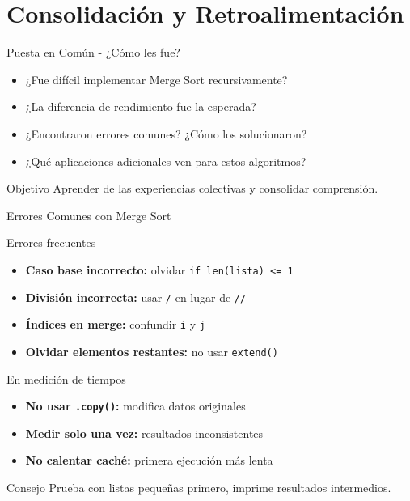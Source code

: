 \documentclass[10pt]{beamer}
\begin{document}
\section{Consolidación y Retroalimentación}

\begin{frame}{Puesta en Común - ¿Cómo les fue?}
  \begin{itemize}
    \item ¿Fue difícil implementar Merge Sort recursivamente?
    \item ¿La diferencia de rendimiento fue la esperada?
    \item ¿Encontraron errores comunes? ¿Cómo los solucionaron?
    \item ¿Qué aplicaciones adicionales ven para estos algoritmos?
  \end{itemize}
  
  \begin{alertblock}{Objetivo}
    Aprender de las experiencias colectivas y consolidar comprensión.
  \end{alertblock}
\end{frame}

\begin{frame}{Errores Comunes con Merge Sort}
  \begin{block}{Errores frecuentes}
    \begin{itemize}
      \item \textbf{Caso base incorrecto:} olvidar \texttt{if len(lista) <= 1}
      \item \textbf{División incorrecta:} usar \texttt{/} en lugar de \texttt{//}
      \item \textbf{Índices en merge:} confundir \texttt{i} y \texttt{j}
      \item \textbf{Olvidar elementos restantes:} no usar \texttt{extend()}
    \end{itemize}
  \end{block}
  
  \begin{block}{En medición de tiempos}
    \begin{itemize}
      \item \textbf{No usar \texttt{.copy()}:} modifica datos originales
      \item \textbf{Medir solo una vez:} resultados inconsistentes
      \item \textbf{No calentar caché:} primera ejecución más lenta
    \end{itemize}
  \end{block}
  
  \begin{alertblock}{Consejo}
    Prueba con listas pequeñas primero, imprime resultados intermedios.
  \end{alertblock}
\end{frame}
\end{document}
